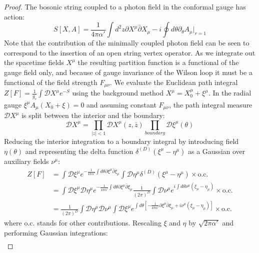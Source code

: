 \begin{tcolorbox}[breakable]
			\begin{proof}	
			The bosonic string coupled to a photon field in the conformal gauge has action:
			\begin{equation}
				S[X, A] = \frac{1}{4\pi\alpha'} \int d^2z \partial X^\mu \bar{\partial} X_\mu - i \oint d\theta \partial_\theta A_\mu \big|_{r=1} 
			\end{equation}
			Note that the contribution of the minimally coupled photon field can be seen to correspond
			to the insertion of an open string vertex operator. As we integrate out the spacetime fields
			$X^{\mu}$ the resulting partition function is a functional of the gauge field only, and because of gauge invariance of the Wilson loop it must be a functional of the field strength $F_{\mu\nu}$. We evaluate the Euclidean path integral $Z[F] = \frac{1}{g_s} \int \mathcal{D}X^\mu e^{-S}$ using the background method $X^\mu = X_0^\mu + \xi^\mu$. In the radial gauge $\xi^\mu A_\mu(X_0 + \xi) = 0$ and assuming constant $F_{\mu\nu}$, the path integral measure $\mathcal{D}X^\mu$ is split between the interior and the boundary:
			\begin{equation}
				\mathcal{D}X^\mu = \prod_{|z|<1} \mathcal{D}X^\mu(z, \bar{z}) \prod_{boundary} \mathcal{D}\xi^\mu(\theta) 
			\end{equation}
			Reducing the interior integration to a boundary integral by introducing field $\eta(\theta)$ and representing the delta function $\delta^{(D)}(\xi^\mu - \eta^\mu)$ as a Gaussian over auxiliary fields $\nu^\mu$:
			\begin{align*}
				Z[F] &= \int \mathcal{D}\xi^\mu e^{-\frac{1}{4\pi\alpha'} \int d\theta \partial \xi^\mu \bar{\partial} \xi_\mu} \int \mathcal{D}\eta^\mu \delta^{(D)}(\xi^\mu - \eta^\mu) \times \text{o.c.} \\
				&= \int \mathcal{D}\xi^\mu \mathcal{D}\eta^\mu e^{-\frac{1}{4\pi\alpha'} \int d\theta \partial \xi^\mu \bar{\partial} \xi_\mu} \frac{1}{(2\pi)^D} \int \mathcal{D}\nu^\mu e^{i \int d\theta \nu^\mu (\xi_\mu - \eta_\mu)} \times \text{o.c.} \\
				&= \frac{1}{(2\pi)^D} \int \mathcal{D}\eta^\mu \mathcal{D}\nu^\mu \int \mathcal{D}\xi^\mu e^{\int d\theta \left[ -\frac{1}{4\pi\alpha'} \partial \xi^\mu \bar{\partial} \xi_\mu + i \nu^\mu (\xi_\mu - \eta_\mu) \right]} \times \text{o.c.}
			\end{align*}
			where o.c. stands for other contributions. Rescaling $\xi$ and $\eta$ by $\sqrt{2\pi \alpha'}$ and performing Gaussian integrations:
			\begin{align*}

\end{align*}
\end{proof}
\end{tcolorbox}
